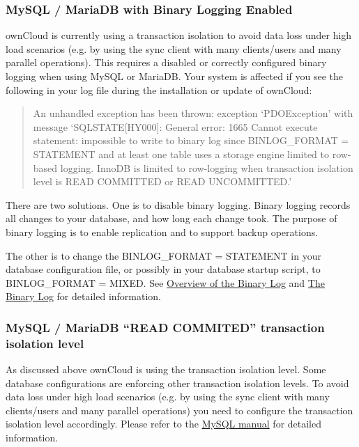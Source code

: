 \documentclass[letterpaper,10pt,english]{sphinxmanual}
\begin{document}
\subsubsection{MySQL / MariaDB with Binary Logging Enabled}
\label{configuration_database/linux_database_configuration:mysql-mariadb-with-binary-logging-enabled}\label{configuration_database/linux_database_configuration:db-binlog-label}
ownCloud is currently using a  transaction isolation
to avoid data loss under high load scenarios (e.g. by using the sync client with
many clients/users and many parallel operations). This requires a disabled or
correctly configured binary logging when using MySQL or MariaDB. Your system is
affected if you see the following in your log file during the installation or
update of ownCloud:
\begin{quote}

An unhandled exception has been thrown:
exception `PDOException' with message `SQLSTATE{[}HY000{]}: General error: 1665
Cannot execute statement: impossible to write to binary log since
BINLOG\_FORMAT = STATEMENT and at least one table uses a storage engine limited
to row-based logging. InnoDB is limited to row-logging when transaction
isolation level is READ COMMITTED or READ UNCOMMITTED.'
\end{quote}

There are two solutions. One is to disable binary logging. Binary logging
records all changes to your database, and how long each change took. The
purpose of binary logging is to enable replication and to support backup
operations.

The other is to change the BINLOG\_FORMAT = STATEMENT in your database
configuration file, or possibly in your database startup script, to
BINLOG\_FORMAT = MIXED. See \href{https://mariadb.com/kb/en/mariadb/overview-of-the-binary-log/}{Overview of the Binary
Log} and \href{https://dev.mysql.com/doc/refman/5.6/en/binary-log.html}{The
Binary Log} for
detailed information.


\subsubsection{MySQL / MariaDB ``READ COMMITED'' transaction isolation level}
\label{configuration_database/linux_database_configuration:mysql-mariadb-read-commited-transaction-isolation-level}\label{configuration_database/linux_database_configuration:db-transaction-label}
As discussed above ownCloud is using the  transaction isolation
level. Some database configurations are enforcing other transaction isolation levels. To avoid
data loss under high load scenarios (e.g. by using the sync client with many clients/users and
many parallel operations) you need to configure the transaction isolation level accordingly.
Please refer to the \href{https://dev.mysql.com/doc/refman/5.7/en/set-transaction.html}{MySQL manual}
for detailed information.
\end{document}
